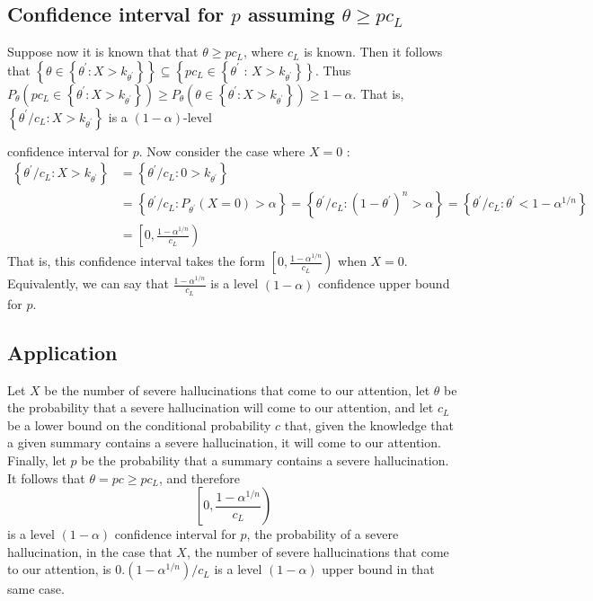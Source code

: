 \subsection{Confidence interval for $p$ assuming $\theta \geq p c_{L}$}

Suppose now it is known that that $\theta \geq p c_{L}$, where $c_{L}$ is known. Then it follows that $\left\{\theta \in\left\{\theta^{\prime}: X>k_{\theta^{\prime}}\right\}\right\} \subseteq\left\{p c_{L} \in\left\{\theta^{\prime}\right.\right.$ : $\left.\left.X>k_{\theta^{\prime}}\right\}\right\}$. Thus $P_{\theta}\left(p c_{L} \in\left\{\theta^{\prime}: X>k_{\theta^{\prime}}\right\}\right) \geq P_{\theta}\left(\theta \in\left\{\theta^{\prime}: X>k_{\theta^{\prime}}\right\}\right) \geq 1-\alpha$. That is, $\left\{\theta^{\prime} / c_{L}: X>k_{\theta^{\prime}}\right\}$ is a $(1-\alpha)$-level

confidence interval for $p$. Now consider the case where $X=0$ :
\begin{align}\label{eq:10}
\left\{\theta^{\prime} / c_{L}: X>k_{\theta^{\prime}}\right\} & =\left\{\theta^{\prime} / c_{L}: 0>k_{\theta^{\prime}}\right\}  \\
\label{eq:11}
& =\left\{\theta^{\prime} / c_{L}: P_{\theta^{\prime}}(X=0)>\alpha\right\}=\left\{\theta^{\prime} / c_{L}:\left(1-\theta^{\prime}\right)^{n}>\alpha\right\}=\left\{\theta^{\prime} / c_{L}: \theta^{\prime}<1-\alpha^{1 / n}\right\}  \\
\label{eq:12}
& =\left[0, \frac{1-\alpha^{1 / n}}{c_{L}}\right)
\end{align}
That is, this confidence interval takes the form $\left[0, \frac{1-\alpha^{1 / n}}{c_{L}}\right)$ when $X=0$. Equivalently, we can say that $\frac{1-\alpha^{1 / n}}{c_{L}}$ is a level $(1-\alpha)$ confidence upper bound for $p$.

\subsection{Application}

Let $X$ be the number of severe hallucinations that come to our attention, let $\theta$ be the probability that a severe hallucination will come to our attention, and let $c_{L}$ be a lower bound on the conditional probability $c$ that, given the knowledge that a given summary contains a severe hallucination, it will come to our attention. Finally, let $p$ be the probability that a summary contains a severe hallucination. It follows that $\theta=p c \geq p c_{L}$, and therefore
$$
\left[0, \frac{1-\alpha^{1 / n}}{c_{L}}\right)
$$
is a level $(1-\alpha)$ confidence interval for $p$, the probability of a severe hallucination, in the case that $X$, the number of severe hallucinations that come to our attention, is $0 .\left(1-\alpha^{1 / n}\right) / c_{L}$ is a level $(1-\alpha)$ upper bound in that same case.

